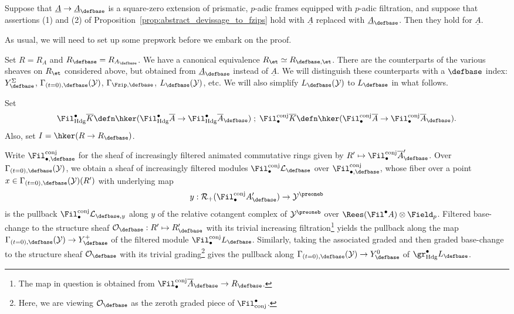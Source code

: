 \documentclass[10pt]{amsart}
\begin{document}
\begin{lemma}
\label{lem:abstract_devissage_def_theory}
Suppose that $\underline{A}\to \underline{A}_\defbase$ is a square-zero extension of prismatic, $p$-adic frames equipped with $p$-adic filtration, and suppose that assertions (1) and (2) of Proposition~\ref{prop:abstract_devissage_to_fzips} hold with $\underline{A}$ replaced with $\underline{A}_\defbase$. Then they hold for $\underline{A}$.
\end{lemma}

As usual, we will need to set up some prepwork before we embark on the proof.
\begin{notation}
Set $R = R_A$ and $R_\defbase = R_{A_{\defbase}}$. We have a canonical equivalence $R_{\et} \simeq R_{\defbase,\et}$. There are the counterparts of the various sheaves on $R_{\et}$ considered above, but obtained from $\underline{A}_\defbase$ instead of $\underline{A}$. We will distinguish these counterparts with a $\defbase$ index: $Y^\Sigma_{\defbase}$, $\Gamma_{(t=0),\defbase}(\mathcal{Y})$, $\Gamma_{\Fzip,\defbase}$, $L_{\defbase}(\mathcal{Y})$, etc. We will also simplify $L_{\defbase}(\mathcal{Y})$ to $L_{\defbase}$ in what follows.

Set
\[
\Fil^\bullet_{\mathrm{Hdg}}\overline{K} \defn \hker(\Fil^\bullet_{\mathrm{Hdg}}\overline{A}\to \Fil^\bullet_{\mathrm{Hdg}}\overline{A}_\defbase)\;;\;\Fil_\bullet^{\mathrm{conj}}\overline{K} \defn \hker(\Fil_\bullet^{\mathrm{conj}}\overline{A}\to \Fil_\bullet^{\mathrm{conj}}\overline{A}_\defbase).
\]
Also, set $I = \hker(R\to R_\defbase)$.
\end{notation}


\begin{construction}
Write $\Fil^{\mathrm{conj}}_{\bullet,\defbase}$ for the sheaf of increasingly filtered animated commutative rings given by $R'\mapsto \Fil^{\mathrm{conj}}_{\bullet}\overline{A}'_{\defbase}$. Over $\Gamma_{(t=0),\defbase}(\mathcal{Y})$, we obtain a sheaf of increasingly filtered modules $\Fil^{\mathrm{conj}}_{\bullet}\mathcal{L}_\defbase$ over $\Fil^{\mathrm{conj}}_{\bullet,\defbase}$, whose fiber over a point $x\in \Gamma_{(t=0),\defbase}(\mathcal{Y})(R')$ with underlying map
\[
y:\mathcal{R}_+(\Fil^{\mathrm{conj}}_\bullet A'_\defbase) \to \mathcal{Y}^\preoneb
\]
is the pullback $\Fil^{\mathrm{conj}}_\bullet\mathcal{L}_{\defbase,y}$ along $y$ of the relative cotangent complex of $\mathcal{Y}^\preoneb$ over $\Rees(\Fil^\bullet A)\otimes\Field_p$. Filtered base-change to the structure sheaf $\mathcal{O}_\defbase:R'\mapsto R'_{\defbase}$ with its trivial increasing filtration\footnote{The map in question is obtained from $\Fil^{\mathrm{conj}}_\bullet\overline{A}_\defbase \to R_\defbase$.} yields the pullback along the map $\Gamma_{(t=0),\defbase}(\mathcal{Y})\to Y^+_{\defbase}$ of the filtered module $\Fil^{\mathrm{conj}}_\bullet L_\defbase$. Similarly, taking the associated graded and then graded base-change to the structure sheaf $\mathcal{O}_\defbase$ with its trivial grading\footnote{Here, we are viewing $\mathcal{O}_\defbase$ as the zeroth graded piece of $\Fil^\bullet_{\mathrm{conj}}$.} gives the pullback along $\Gamma_{(t=0),\defbase}(\mathcal{Y})\to Y^0_{\defbase}$ of $\gr^\bullet_{\mathrm{Hdg}}L_\defbase$. 
\end{construction}
\end{document}
